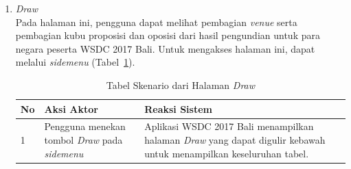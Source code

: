 \begin{enumerate}
	\item {\it Draw} \\ 
	Pada halaman ini, pengguna dapat melihat pembagian {\it venue} serta pembagian kubu proposisi dan oposisi dari hasil pengundian untuk para negara peserta WSDC 2017 Bali. Untuk mengakses halaman ini, dapat melalui \textit{sidemenu} (Tabel~\ref{table:skenarioHalamanDraw}).
		\begin{table}[H]
			\centering
			\begin{tabular}{|p{0.5cm}|p{7cm}|p{7cm}|}
				\hline
				No & Aksi Aktor                               & Reaksi Sistem                                          \\ \hline
				1  & Pengguna menekan tombol \textit{Draw} pada \textit{sidemenu} & Aplikasi WSDC 2017 Bali menampilkan halaman \textit{Draw} yang dapat digulir kebawah untuk menampilkan keseluruhan tabel. \\ \hline
			\end{tabular}
			\caption{Tabel Skenario dari Halaman {\it Draw}}
			\label{table:skenarioHalamanDraw}
		\end{table}
	

\end{enumerate}

